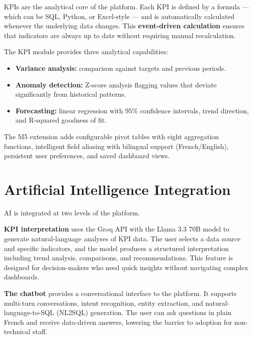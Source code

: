 \noindent
KPIs are the analytical core of the platform.
Each KPI is defined by a formula —
which can be SQL, Python, or Excel-style —
and is automatically calculated
whenever the underlying data changes.
This \textbf{event-driven calculation}
ensures that indicators are always up to date
without requiring manual recalculation.

\vspace{0.4cm}
\noindent
The KPI module provides three analytical capabilities:

\begin{itemize}
  \item \textbf{Variance analysis:} comparison against
        targets and previous periods.
  \item \textbf{Anomaly detection:} Z-score analysis
        flagging values that deviate significantly
        from historical patterns.
  \item \textbf{Forecasting:} linear regression
        with 95\% confidence intervals,
        trend direction, and R-squared goodness of fit.
\end{itemize}

\noindent
The M5 extension adds configurable pivot tables
with eight aggregation functions,
intelligent field aliasing with bilingual support
(French/English), persistent user preferences,
and saved dashboard views.


\section{Artificial Intelligence Integration}

\noindent
AI is integrated at two levels
of the platform.

\vspace{0.4cm}
\noindent
\textbf{KPI interpretation} uses the Groq API
with the Llama 3.3 70B model to generate
natural-language analyses of KPI data.
The user selects a data source and specific indicators,
and the model produces a structured interpretation
including trend analysis, comparisons, and recommendations.
This feature is designed for decision-makers
who need quick insights without navigating
complex dashboards.

\vspace{0.4cm}
\noindent
\textbf{The chatbot} provides a conversational
interface to the platform.
It supports multi-turn conversations,
intent recognition, entity extraction,
and natural-language-to-SQL (NL2SQL) generation.
The user can ask questions in plain French
and receive data-driven answers,
lowering the barrier to adoption
for non-technical staff.


